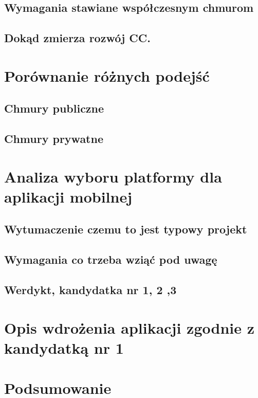 \documentclass[12pt,a4paper,twoside,titlepage,openright]{book}
\begin{document}
\section{Wymagania stawiane współczesnym chmurom}




\section{Dokąd zmierza rozwój CC.}


\chapter{Porównanie różnych podejść}



\section{Chmury publiczne}

\section{Chmury prywatne}


\chapter{Analiza wyboru platformy dla aplikacji mobilnej}

\section{Wytumaczenie czemu to jest typowy projekt}

\section{Wymagania co trzeba wziąć pod uwagę}

\section{Werdykt, kandydatka nr 1, 2 ,3}



\chapter{Opis wdrożenia aplikacji zgodnie z kandydatką nr 1 }
 
\chapter*{Podsumowanie}
 
 
 
 
\listoffigures

\listoftables



\printbibliography
 
\end{document}
